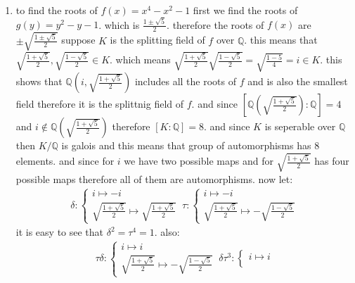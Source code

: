 \begin{enumerate}[label=]
    \item 
        to find the roots of $f(x) = x^4 - x^2 - 1$ first we find the roots of $g(y) = y^2 - y - 1$.
        which is $\frac{1 \pm\sqrt{5}}{2}$. therefore the roots of $f(x)$ are $\pm \sqrt{\frac{1 \pm \sqrt{5}}{2}}$
        suppose $K$ is the splitting field of $f$ over $\mathbb Q$.
        this means that $\sqrt{\frac{1 + \sqrt{5}}{2}}, \sqrt{\frac{1 - \sqrt{5}}{2}} \in K$.
        which means $\sqrt{\frac{1 + \sqrt{5}}{2}} \sqrt{\frac{1 - \sqrt{5}}{2}} = \sqrt{\frac{1 - 5}{4}} = i \in K$.
        this shows that $\mathbb Q(i, \sqrt{\frac{1 + \sqrt{5}}{2}})$ includes all the roots of $f$ and is also the smallest field therefore it is the splittnig field of $f$.
        and since $[\mathbb Q(\sqrt{\frac{1 + \sqrt{5}}{2}}): \mathbb Q] = 4$ and $i \notin \mathbb Q(\sqrt{\frac{1 + \sqrt{5}}{2}})$ therefore $[K:\mathbb Q] = 8$.
        and since $K$ is seperable over $\mathbb Q$ then $K / \mathbb Q$ is galois and this means that group of automorphisms has 8 elements.
        and since for $i$ we have two possible maps and for $\sqrt{\frac{1 + \sqrt{5}}{2}}$ has four possible maps therefore all of them are automorphisms.
        now let:
        \begin{gather*}
            \delta :
            \begin{cases}
                i \mapsto -i \\
                \sqrt{\frac{1 + \sqrt{5}}{2}} \mapsto  \sqrt{\frac{1 + \sqrt{5}}{2}}
            \end{cases} \
            \tau :
            \begin{cases}
                i \mapsto -i \\
                \sqrt{\frac{1 + \sqrt{5}}{2}} \mapsto -\sqrt{\frac{1 - \sqrt{5}}{2}}
            \end{cases} 
        \end{gather*}
        it is easy to see that $\delta^2 = \tau^4 = 1$. also:
        \begin{gather*}
            \tau \delta:
            \begin{cases}
                i \mapsto i \\
                \sqrt{\frac{1 + \sqrt{5}}{2}} \mapsto  -\sqrt{\frac{1 - \sqrt{5}}{2}}
            \end{cases} \
            \delta \tau^3: 
            \begin{cases}
                i \mapsto i \\

\end{cases}
\end{gather*}
\end{enumerate}
